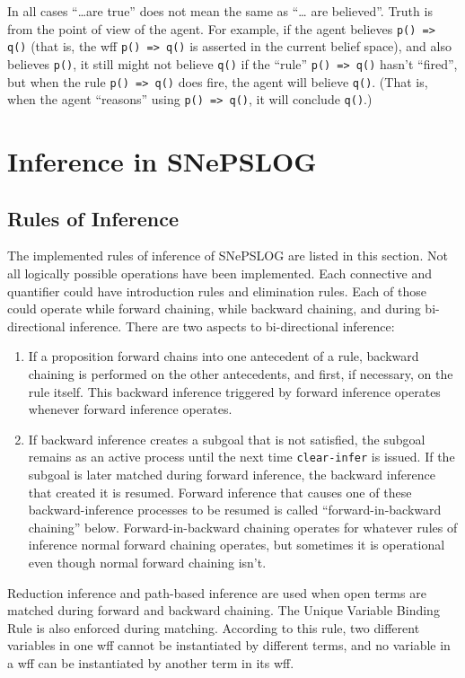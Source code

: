 \documentclass{book}
\begin{document}
In all cases ``\ldots are true'' does not mean the same as ``\ldots
are believed''.  Truth is from the point of view of the agent.  For
example, if the agent believes \texttt{p() => q()} (that is, the wff
\texttt{p() => q()} is asserted in the current belief space), and also
believes \texttt{p()}, it still might not believe \texttt{q()} if the
``rule'' \texttt{p() => q()} hasn't ``fired'', but when the rule
\texttt{p() => q()} does fire, the agent will believe \texttt{q()}.
(That is, when the agent ``reasons'' using \texttt{p() => q()}, it
will conclude \texttt{q()}.)

\section{Inference in SNePSLOG}\label{snepslogsnip:sec}
\subsection{Rules of Inference}
The implemented rules of inference of SNePSLOG are listed in this
section.  Not all logically possible operations have been implemented.
Each connective and quantifier could have introduction rules and
elimination rules.  Each of those could operate while forward
chaining, while backward chaining, and during bi-directional
inference.  There are two aspects to bi-directional inference:
\begin{enumerate}
\item If a proposition forward chains into one antecedent of a rule,
  backward chaining is performed on the other antecedents, and first,
  if necessary, on the rule itself.  This backward inference triggered
  by forward inference operates whenever forward inference operates.
\item If backward inference creates a subgoal that is not satisfied,
  the subgoal remains as an active process until the next time
  \texttt{clear-infer} is issued.  If the subgoal is later matched
  during forward inference, the backward inference that created it is
  resumed.  Forward inference that causes one of these
  backward-inference processes to be resumed is called
  ``forward-in-backward chaining'' below. Forward-in-backward chaining
  operates for whatever rules of inference normal forward chaining
  operates, but sometimes it is operational even though normal forward
  chaining isn't.
\end{enumerate}

Reduction inference and path-based inference are used when open terms
are matched during forward and backward chaining.  The Unique Variable
Binding Rule is also enforced during matching.  According to this
rule, two different variables in one wff cannot be instantiated by
different terms, and no variable in a wff can be instantiated by
another term in its wff.
\end{document}
